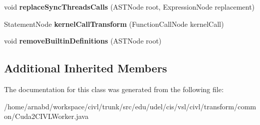 \begin{DoxyCompactItemize}
\item 
\hypertarget{classedu_1_1udel_1_1cis_1_1vsl_1_1civl_1_1transform_1_1common_1_1Cuda2CIVLWorker_a8def93d99a6485c7b820fdcb9cf60008}{}void {\bfseries replace\+Sync\+Threads\+Calls} (A\+S\+T\+Node root, Expression\+Node replacement)\label{classedu_1_1udel_1_1cis_1_1vsl_1_1civl_1_1transform_1_1common_1_1Cuda2CIVLWorker_a8def93d99a6485c7b820fdcb9cf60008}

\item 
\hypertarget{classedu_1_1udel_1_1cis_1_1vsl_1_1civl_1_1transform_1_1common_1_1Cuda2CIVLWorker_a73f29b7ee5bfeeecd9d858075ddfcaa2}{}Statement\+Node {\bfseries kernel\+Call\+Transform} (Function\+Call\+Node kernel\+Call)\label{classedu_1_1udel_1_1cis_1_1vsl_1_1civl_1_1transform_1_1common_1_1Cuda2CIVLWorker_a73f29b7ee5bfeeecd9d858075ddfcaa2}

\item 
\hypertarget{classedu_1_1udel_1_1cis_1_1vsl_1_1civl_1_1transform_1_1common_1_1Cuda2CIVLWorker_a1a580fdabdb96c3e33462ffadbd34449}{}void {\bfseries remove\+Builtin\+Definitions} (A\+S\+T\+Node root)\label{classedu_1_1udel_1_1cis_1_1vsl_1_1civl_1_1transform_1_1common_1_1Cuda2CIVLWorker_a1a580fdabdb96c3e33462ffadbd34449}

\end{DoxyCompactItemize}
\subsection*{Additional Inherited Members}


The documentation for this class was generated from the following file\+:\begin{DoxyCompactItemize}
\item 
/home/arnabd/workspace/civl/trunk/src/edu/udel/cis/vsl/civl/transform/common/Cuda2\+C\+I\+V\+L\+Worker.\+java\end{DoxyCompactItemize}
